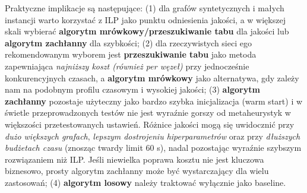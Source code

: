 Praktyczne implikacje są następujące: (1) dla grafów syntetycznych i małych instancji warto korzystać z ILP jako punktu odniesienia jakości, a w większej skali wybierać \textbf{algorytm mrówkowy/przeszukiwanie tabu} dla jakości lub \textbf{algorytm zachłanny} dla szybkości; (2) dla rzeczywistych sieci ego rekomendowanym wyborem jest \textbf{przeszukiwanie tabu} jako metoda zapewniająca \emph{najniższy koszt (również per węzeł)} przy jednocześnie konkurencyjnych czasach, a \textbf{algorytm mrówkowy} jako alternatywa, gdy zależy nam na podobnym profilu czasowym i wysokiej jakości; (3) \textbf{algorytm zachłanny} pozostaje użyteczny jako bardzo szybka inicjalizacja (warm start) i w świetle przeprowadzonych testów nie jest wyraźnie gorszy od metaheurystyk w większości przetestowanych ustawień. Różnice jakości mogą się uwidocznić przy \emph{dużo większych grafach}, \emph{lepszym dostrojeniu hiperparametrów} oraz przy \emph{dłuższych budżetach czasu} (znosząc twardy limit 60 s), nadal pozostając wyraźnie szybszym rozwiązaniem niż ILP. Jeśli niewielka poprawa kosztu nie jest kluczowa biznesowo, prosty algorytm zachłanny może być wystarczający dla wielu zastosowań; (4) \textbf{algorytm losowy} należy traktować wyłącznie jako baseline.
